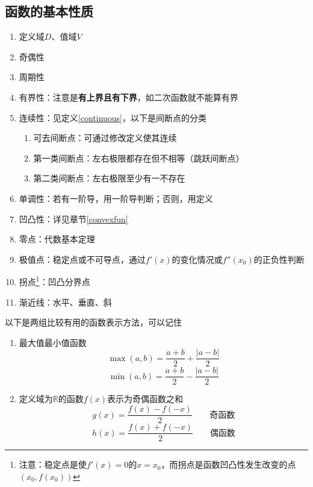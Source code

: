 \subsection{函数的基本性质}
\begin{enumerate}
	\item 定义域$D$、值域$V$
	\item 奇偶性
	\item 周期性
	\item 有界性：注意是\textbf{有上界且有下界}，如二次函数就不能算有界
	\item 连续性：见定义\ref{continuous}，以下是间断点的分类
	\begin{enumerate}
		\item 可去间断点：可通过修改定义使其连续
		\item 第一类间断点：左右极限都存在但不相等（跳跃间断点）
		\item 第二类间断点：左右极限至少有一不存在
	\end{enumerate}
	\item 单调性：若有一阶导，用一阶导判断；否则，用定义
	\item 凹凸性：详见章节\ref{convexfun}
	\item 零点：代数基本定理
	\item 极值点：稳定点或不可导点，通过$f'(x)$的变化情况或$f''(x_0)$的正负性判断
	\item 拐点\footnote{注意：稳定点是使$f'(x)=0$的$x=x_0$，而拐点是函数凹凸性发生改变的点$(x_0,f(x_0))$}：凹凸分界点
	\item 渐近线：水平、垂直、斜
\end{enumerate}
以下是两组比较有用的函数表示方法，可以记住
\begin{enumerate}
	\item 最大值最小值函数
		\[\max(a,b)=\frac{a+b}{2}+\frac{|a-b|}{2}\]
		\[\min(a,b)=\frac{a+b}{2}-\frac{|a-b|}{2}\]
	\item 定义域为$\mathbb{R}$的函数$f(x)$表示为奇偶函数之和
		\[g(x)=\frac{f(x)-f(-x)}{2}\qquad\mbox{奇函数}\]
		\[h(x)=\frac{f(x)+f(-x)}{2}\qquad\mbox{偶函数}\]
\end{enumerate}

